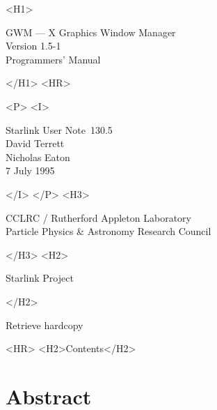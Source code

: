 \documentclass[twoside,11pt]{article}
\newcommand{\stardoccategory}  {Starlink User Note}
\newcommand{\stardocsource}    {sun\stardocnumber}
\newcommand{\stardocnumber}    {130.5}
\newcommand{\stardocauthors}   {David Terrett\\Nicholas Eaton}
\newcommand{\stardocdate}      {7 July 1995}
\newcommand{\stardoctitle}     {GWM --- X Graphics Window Manager}
\newcommand{\stardocversion}   {Version 1.5-1}
\newcommand{\stardocmanual}    {Programmers' Manual}
\newcommand{\htmladdnormallink}[2]{#1}
\newcommand{\htmladdimg}[1]{}
\newcommand{\htmlref}[2]{#1}
\newcommand{\htmladdtonavigation}[1]{}
\newcommand{\xlabel}[1]{}
\renewcommand{\_}{\texttt{\symbol{95}}}
\begin{document}
\begin{htmlonly}
   \xlabel{}
   \begin{rawhtml} <H1> \end{rawhtml}
      \stardoctitle\\
      \stardocversion\\
      \stardocmanual
   \begin{rawhtml} </H1> <HR> \end{rawhtml}


   \begin{rawhtml} <P> <I> \end{rawhtml}
   \stardoccategory\ \stardocnumber \\
   \stardocauthors \\
   \stardocdate
   \begin{rawhtml} </I> </P> <H3> \end{rawhtml}
      \htmladdnormallink{CCLRC / Rutherford Appleton Laboratory}
                        {http://www.cclrc.ac.uk} \\
      \htmladdnormallink{Particle Physics \& Astronomy Research Council}
                        {http://www.pparc.ac.uk} \\
   \begin{rawhtml} </H3> <H2> \end{rawhtml}
      \htmladdnormallink{Starlink Project}{http://www.starlink.rl.ac.uk/}
   \begin{rawhtml} </H2> \end{rawhtml}
   \htmladdnormallink{\htmladdimg{source.gif} Retrieve hardcopy}
      {http://www.starlink.rl.ac.uk/cgi-bin/hcserver?\stardocsource}\\

  \label{stardoccontents}
  \begin{rawhtml} 
    <HR>
    <H2>Contents</H2>
  \end{rawhtml}
  \htmladdtonavigation{\htmlref{\htmladdimg{contents_motif.gif}}
        {stardoccontents}}

  \section{\xlabel{abstract}Abstract}
\end{htmlonly}
\end{document}
